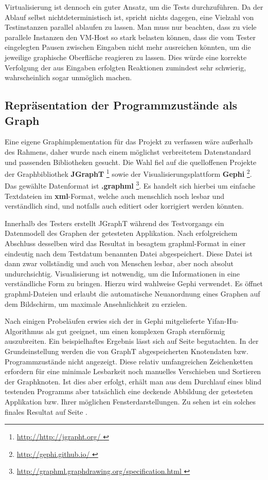 Virtualisierung ist dennoch ein guter Ansatz, um die Tests
durchzuführen. Da der Ablauf selbst nichtdeterministisch ist,
spricht nichts dagegen, eine Vielzahl von Testinstanzen parallel ablaufen zu
lassen. Man muss nur beachten, dass zu viele parallele Instanzen den VM-Host
so stark belasten können, dass die vom Tester eingelegten Pausen
zwischen Eingaben nicht mehr ausreichen könnten, um die jeweilige graphische
Oberfläche reagieren zu lassen. Dies würde eine korrekte Verfolgung
der aus Eingaben erfolgten Reaktionen zumindest sehr schwierig,
wahrscheinlich sogar unmöglich machen.


\subsection{Repräsentation der Programmzustände als Graph}

Eine eigene Graphimplementation für das Projekt zu verfassen wäre
außerhalb des Rahmens, daher wurde nach einem möglichst verbreitetem
Datenstandard und passenden Bibliotheken gesucht. Die Wahl fiel auf
die quelloffenen Projekte der Graphbibliothek \textbf{JGraphT} \footnote{\url{ http://http://jgrapht.org/ }} 
sowie der Visualisierungsplattform \textbf{Gephi} \footnote{\url{ http://gephi.github.io/ }}.
Das gewählte Datenformat ist \textbf{.graphml} \footnote{\url{ http://graphml.graphdrawing.org/specification.html }}.
Es handelt sich hierbei um einfache Textdateien im \textbf{xml}-Format,
welche auch menschlich noch lesbar und verständlich sind, und notfalls
auch editiert oder korrigiert werden könnten. 

Innerhalb des Testers erstellt JGraphT während des Testvorgangs 
ein Datenmodell des Graphen der getesteten Applikation. Nach erfolgreichem
Abschluss desselben wird das Resultat in besagtem graphml-Format
in einer eindeutig nach dem Testdatum benannten Datei abgespeichert.
Diese Datei ist dann zwar vollständig und auch von Menschen lesbar,
aber noch absolut undurchsichtig. Visualisierung ist notwendig,
um die Informationen in eine verständliche Form zu bringen.
Hierzu wird wahlweise Gephi verwendet. Es öffnet graphml-Dateien
und erlaubt die automatische Neuanordnung eines Graphen auf dem
Bildschirm, um maximale Ansehnlichkeit zu erzielen.

Nach einigen Probeläufen erwies sich der in Gephi mitgelieferte 
Yifan-Hu-Algorithmus \cite{hu2005efficient} als gut geeignet,
um einen komplexen Graph sternförmig auszubreiten. Ein beispielhaftes
Ergebnis lässt sich auf Seite \pageref{fig:model_firstspirit_notext}
begutachten. In der Grundeinstellung werden die von GraphT
abgespeicherten Knotendaten bzw. Programmzustände nicht angezeigt.
Diese relativ umfangreichen Zeichenketten erfordern für eine minimale
Lesbarkeit noch manuelles Verschieben und Sortieren der Graphknoten.
Ist dies aber erfolgt, erhält man aus dem Durchlauf eines blind testenden
Programms aber tatsächlich eine deckende Abbildung der getesteten
Applikation bzw. Ihrer möglichen Fensterdarstellungen. Zu sehen
ist ein solches finales Resultat auf Seite \pageref{fig:model_freespirit_06.10.2015}.

